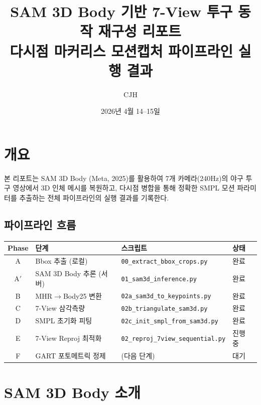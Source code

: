 \documentclass[11pt, a4paper]{article}
\title{\textbf{SAM 3D Body 기반 7-View 투구 동작 재구성 리포트} \\
\large 다시점 마커리스 모션캡처 파이프라인 실행 결과}
\author{CJH}
\date{2026년 4월 14--15일}
\begin{document}
\maketitle
\tableofcontents
\newpage

\section{개요}

본 리포트는 SAM 3D Body (Meta, 2025)를 활용하여 7개 카메라(240Hz)의 야구 투구 영상에서 3D 인체 메시를 복원하고, 다시점 병합을 통해 정확한 SMPL 모션 파라미터를 추출하는 전체 파이프라인의 실행 결과를 기록한다.

\subsection{파이프라인 흐름}

\begin{center}
\begin{tabular}{c l l l}
\toprule
\textbf{Phase} & \textbf{단계} & \textbf{스크립트} & \textbf{상태} \\
\midrule
A & Bbox 추출 (로컬) & \texttt{00\_extract\_bbox\_crops.py} & \textcolor{pass}{완료} \\
A$'$ & SAM 3D Body 추론 (서버) & \texttt{01\_sam3d\_inference.py} & \textcolor{pass}{완료} \\
B & MHR$\to$Body25 변환 & \texttt{02a\_sam3d\_to\_keypoints.py} & \textcolor{pass}{완료} \\
C & 7-View 삼각측량 & \texttt{02b\_triangulate\_sam3d.py} & \textcolor{pass}{완료} \\
D & SMPL 초기화 피팅 & \texttt{02c\_init\_smpl\_from\_sam3d.py} & \textcolor{pass}{완료} \\
E & 7-View Reproj 최적화 & \texttt{02\_reproj\_7view\_sequential.py} & \textcolor{warn}{진행 중} \\
F & GART 포토메트릭 정제 & (다음 단계) & 대기 \\
\bottomrule
\end{tabular}
\end{center}

\section{SAM 3D Body 소개}
\end{document}
